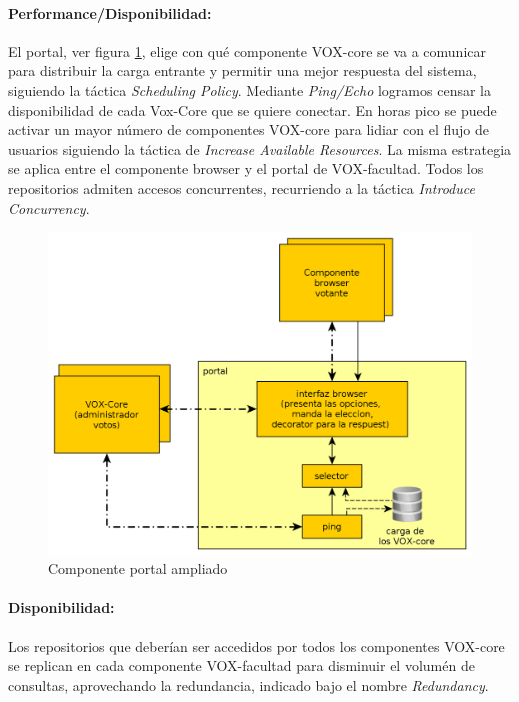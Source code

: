 \paragraph{Performance/Disponibilidad:}
El portal,  ver figura \ref{fig:portal}, elige con qué componente VOX-core se va a comunicar para distribuir la carga entrante y permitir una mejor respuesta del sistema, siguiendo la táctica \textit{Scheduling Policy}. Mediante \textit{Ping/Echo} logramos censar la disponibilidad de cada Vox-Core que se quiere conectar. En horas pico se puede activar un mayor número de componentes VOX-core para lidiar con el flujo de usuarios siguiendo la táctica de \textit{Increase Available Resources}. La misma estrategia se aplica entre el componente browser y el portal de VOX-facultad.
Todos los repositorios admiten accesos concurrentes, recurriendo a la táctica \textit{Introduce Concurrency}.
\begin{figure}[H]
	\begin{center}
		\includegraphics[scale=0.22]{../diagramas/portal.png}
	\end{center}
	\caption{Componente portal ampliado}	
	\label{fig:portal}
\end{figure}

\paragraph{Disponibilidad:}
Los repositorios que deberían ser accedidos por todos los componentes VOX-core se replican en cada componente VOX-facultad para disminuir el volumén de consultas, aprovechando la redundancia, indicado bajo el nombre \textit{Redundancy}.

